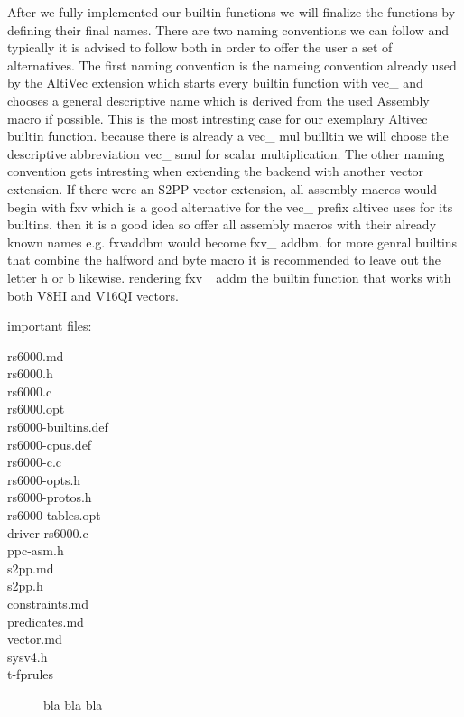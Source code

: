 After we fully implemented our builtin functions we will finalize the functions by defining their final names.
There are two naming conventions we can follow and typically it is advised to follow both in order to offer the user a set of alternatives.
The first naming convention is the nameing convention already used by the AltiVec extension which starts every builtin function with vec\_ and chooses a general descriptive name which is derived from the used Assembly macro if possible.
This is the most intresting case for our exemplary Altivec builtin function.
because there is already a vec\_ mul builltin we will choose the descriptive abbreviation vec\_ smul for scalar multiplication.
The other naming convention gets intresting when extending the backend with another vector extension.
If there were an S2PP vector extension, all assembly macros would begin with fxv which is a good alternative for the vec\_ prefix altivec uses for its builtins.
then it is a good idea so offer all assembly macros with their already known names e.g.
fxvaddbm would become fxv\_ addbm.
for more genral builtins that combine the halfword and byte macro it is recommended to leave out the letter h or b likewise.
rendering fxv\_ addm the builtin function that works with both V8HI and V16QI vectors.

important files:
\begin{description}
    \item[rs6000.md]
    \item[rs6000.h]
    \item[rs6000.c]
    \item[rs6000.opt]
    \item[rs6000-builtins.def]
    \item[rs6000-cpus.def]
    \item[rs6000-c.c]
    \item[rs6000-opts.h]
    \item[rs6000-protos.h]
    \item[rs6000-tables.opt]
    \item[driver-rs6000.c]
    \item[ppc-asm.h]
    \item[s2pp.md]
    \item[s2pp.h]
    \item[constraints.md]
    \item[predicates.md]
    \item[vector.md]
    \item[sysv4.h]
    \item[t-fprules] bla bla bla
\end{description}
        
